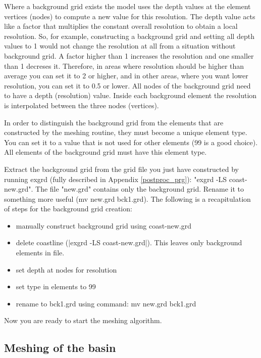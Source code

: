 Where a background grid exists the model uses the depth values at the
element vertices (nodes) to compute a new value for this resolution.
The depth value acts like a factor that multiplies the constant
overall resolution to obtain a local resolution. So, for example,
constructing a background grid and setting all depth values to 1
would not change the resolution at all from a situation without
background grid. A factor higher than 1 increases the resolution
and one smaller than 1 decreses it. Therefore, in areas where
resolution should be higher than average you can set it to
2 or higher, and in other areas, where you want lower resolution,
you can set it to 0.5 or lower. All nodes of the background grid
need to have a depth (resolution) value. Inside each background
element the resolution is interpolated between the three nodes
(vertices).

In order to distinguish the background grid from the elements
that are constructed by the meshing routine, they must become
a unique element type. You can set it to a value that is not
used for other elements (99 is a good choice). All elements
of the background grid must have this element type.

Extract the background grid from the grid file you just
have constructed by running exgrd (fully described in Appendix \ref{postproc_prg}): "exgrd -LS coast-new.grd".
The file "new.grd" contains only the background grid. Rename it to
something more useful (mv new.grd bck1.grd).
The following is a recapitulation of steps for the background grid creation:

\begin{itemize}
\item        manually construct background grid using coast-new.grd
\item        delete coastline (|exgrd -LS coast-new.grd|).
		This leaves only background elements in file.
\item        set depth at nodes for resolution
\item        set type in elements to 99 
\item        rename to bck1.grd using command:   mv new.grd bck1.grd
\end{itemize}

Now you are ready to start the meshing algorithm.

\subsection{Meshing of the basin}

